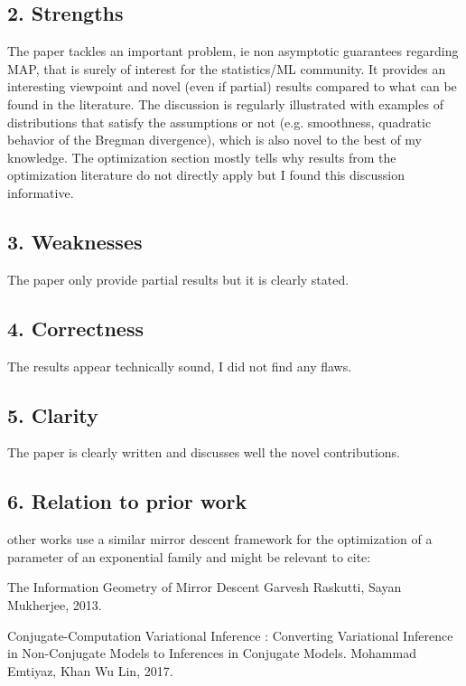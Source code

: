 \subsection*{2. Strengths}

The paper tackles an important problem, ie non asymptotic guarantees regarding MAP, that is surely of interest for the statistics/ML community. It provides an interesting viewpoint and novel (even if partial) results compared to what can be found in the literature. The discussion is regularly illustrated with examples of distributions that satisfy the assumptions or not (e.g. smoothness, quadratic behavior of the Bregman divergence), which is also novel to the best of my knowledge. The optimization section mostly tells why results from the optimization literature do not directly apply but I found this discussion informative.

\subsection*{3. Weaknesses}

The paper only provide partial results but it is clearly stated.

\subsection*{4. Correctness}

The results appear technically sound, I did not find any flaws.

\subsection*{5. Clarity}

The paper is clearly written and discusses well the novel contributions.

\subsection*{6. Relation to prior work}

other works use a similar mirror descent framework for the optimization of a parameter of an exponential family and might be relevant to cite:

The Information Geometry of Mirror Descent
Garvesh Raskutti, Sayan Mukherjee, 2013.

Conjugate-Computation Variational Inference : Converting Variational Inference in Non-Conjugate Models to Inferences in Conjugate Models. Mohammad Emtiyaz, Khan Wu Lin, 2017.

